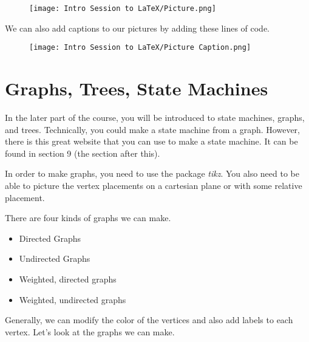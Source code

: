 \documentclass[11pt]{article}
\begin{document}
\vspace{3mm}
\begin{figure}[htbp]
    \centerline{\texttt{[image: Intro Session to LaTeX/Picture.png]}}
\end{figure}
\vspace{3mm}

We can also add captions to our pictures by adding these lines of code.

\vspace{3mm}
\begin{figure}[htbp]
    \centerline{\texttt{[image: Intro Session to LaTeX/Picture Caption.png]}}
\end{figure}
\vspace{3mm}

\section{Graphs, Trees, State Machines}
In the later part of the course, you will be introduced to state machines, graphs, and trees. Technically, you could make a state machine from a graph. However, there is this great website that you can use to make a state machine. It can be found in section 9 (the section after this). 
\vspace{3mm}

In order to make graphs, you need to use the package \emph{tikz}. You also need to be able to picture the vertex placements on a cartesian plane or with some relative placement.
\vspace{3mm}

There are four kinds of graphs we can make.
\begin{itemize}
    \item Directed Graphs
    \item Undirected Graphs
    \item Weighted, directed graphs
    \item Weighted, undirected graphs
\end{itemize}
\vspace{3mm}
Generally, we can modify the color of the vertices and also add labels to each vertex. Let's look at the graphs we can make.

\pagebreak{}

\vspace{3mm}
\end{document}
